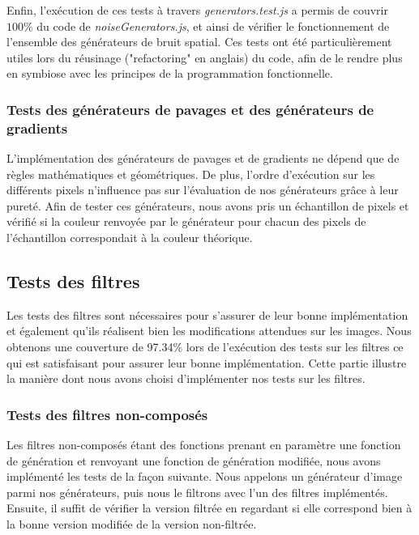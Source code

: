\documentclass[11pt]{article}
\begin{document}
Enfin, l'exécution de ces tests à travers \textit{generators.test.js} a permis de couvrir $100\%$ du code de \textit{noiseGenerators.js}, et ainsi de vérifier le fonctionnement de l'ensemble des générateurs de bruit spatial. Ces tests ont été particulièrement utiles lors du réusinage ("refactoring" en anglais) du code, afin de le rendre plus en symbiose avec les principes de la programmation fonctionnelle.

\subsubsection{Tests des générateurs de pavages et des générateurs de gradients}

L'implémentation des générateurs de pavages et de gradients ne dépend que de règles mathématiques et géométriques. De plus, l'ordre d'exécution sur les différents pixels n'influence pas sur l'évaluation de nos générateurs grâce à leur pureté. Afin de tester ces générateurs, nous avons pris un échantillon de pixels et vérifié si la couleur renvoyée par le générateur pour chacun des pixels de l'échantillon correspondait à la couleur théorique.

\subsection{Tests des filtres}

Les tests des filtres sont nécessaires pour s'assurer de leur bonne implémentation et également qu'ils réalisent bien les modifications attendues sur les images. Nous obtenons une couverture de 97.34\% lors de l'exécution des tests sur les filtres ce qui est satisfaisant pour assurer leur bonne implémentation. Cette partie illustre la manière dont nous avons choisi d'implémenter nos tests sur les filtres.

\subsubsection{Tests des filtres non-composés}

Les filtres non-composés étant des fonctions prenant en paramètre une fonction de génération et renvoyant une fonction de génération modifiée, nous avons implémenté les tests de la façon suivante. Nous appelons un générateur d'image parmi nos générateurs, puis nous le filtrons avec l'un des filtres implémentés. Ensuite, il suffit de vérifier la version filtrée en regardant si elle correspond bien à la bonne version modifiée de la version non-filtrée. \\
\end{document}
